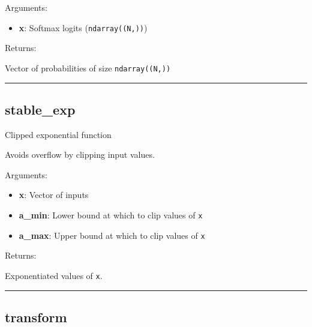 Arguments:

\begin{itemize}
\tightlist
\item
  \textbf{x}: Softmax logits (\texttt{ndarray((N,))})
\end{itemize}

Returns:

Vector of probabilities of size \texttt{ndarray((N,))}

\begin{center}\rule{0.5\linewidth}{\linethickness}\end{center}

\subsection{stable\_exp}\label{stable_exp}

\begin{Shaded}
\begin{Highlighting}[]
\OperatorTok{=-}\OperatorTok{=}\NormalTok{)}
\end{Highlighting}
\end{Shaded}

Clipped exponential function

Avoids overflow by clipping input values.

Arguments:

\begin{itemize}
\tightlist
\item
  \textbf{x}: Vector of inputs
\item
  \textbf{a\_min}: Lower bound at which to clip values of \texttt{x}
\item
  \textbf{a\_max}: Upper bound at which to clip values of \texttt{x}
\end{itemize}

Returns:

Exponentiated values of \texttt{x}.

\begin{center}\rule{0.5\linewidth}{\linethickness}\end{center}

\subsection{transform}\label{transform}

\begin{Shaded}
\begin{Highlighting}[]
\end{Highlighting}
\end{Shaded}

